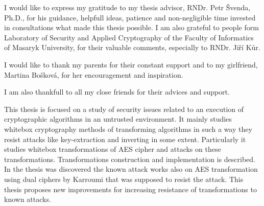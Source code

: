 \documentclass[11pt,oneside,final]{fithesis2}
\begin{document}
\newenvironment{atribut_description}
{\begin{description}
  \renewcommand{\makelabel}[1]{\texttt{\hspace{6pt}##1 $-$}}%
  \setlength{\itemsep}{1pt}
  \setlength{\parskip}{0pt}
  \setlength{\parsep}{0pt}}
{\end{description}}
\renewcommand{\tiny}{\fontsize{7.7}{9.7}\selectfont}

\FrontMatter
\ThesisTitlePage


\begin{ThesisDeclaration}
\DeclarationText
\AdvisorName
\end{ThesisDeclaration}

\begin{ThesisThanks}
I would like to express my gratitude to my thesis advisor, RNDr. Petr Švenda, Ph.D., for his guidance, helpfull ideas, patience and 
non-negligible time invested in consultations what made this thesis possible. I am also grateful to people form 
Laboratory of Security and Applied Cryptography of the Faculty of Informatics of Masaryk University, for their valuable comments,
especially to RNDr. Jiří Kůr.

I would like to thank my parents for their constant support and to my girlfriend, Martina Bošková, for her encouragement and inspiration.

I am also thankfull to all my close friends for their advices and support.

    
\end{ThesisThanks}

\begin{ThesisAbstract}
This thesis is focused on a study of security issues related to an execution of cryptographic algorithms in an untrusted environment.
It mainly studies whitebox cryptography methods of transforming algorithms in such a way they resist attacks like key-extraction and inverting in some extent.
Particularly it studies whitebox transformations of AES cipher and attacks on these transformations. Transformations construction and implementation is described.
In the thesis was discovered the known attack works also on AES transformation using dual ciphers by Karroumi \citep{Karroumi:2010:PWA:2041036.2041060}
that was supposed to resist the attack.
This thesis proposes new improvements for increasing resistance of transformations to known attacks.
\end{ThesisAbstract}
\end{document}
